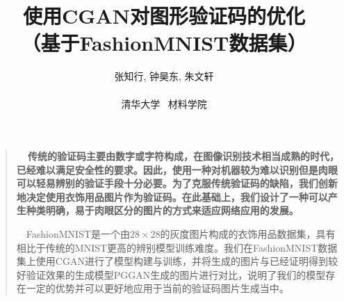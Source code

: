 \documentclass[12pt]{article}
\title{使用CGAN对图形验证码的优化\\ \normalsize{（基于FashionMNIST数据集）}}
\author
{张知行, 钟昊东, 朱文轩\\
\\
\normalsize{清华大学 \ 材料学院}\\
}
\date{}
\newenvironment{sciabstract}{%
\begin{quote} \bf}
{\end{quote}}
\begin{document}
 


\baselineskip24pt


\maketitle 




\begin{sciabstract}
  \ \ 传统的验证码主要由数字或字符构成，在图像识别技术相当成熟的时代，已经难以满足安全性的要求。因此，使用一种对机器较为难以识别但是肉眼可以轻易辨别的验证手段十分必要。为了克服传统验证码的缺陷，我们创新地决定使用衣饰用品图片作为验证码。在此基础上，我们设计了一种可以产生种类明确，易于肉眼区分的图片的方式来适应网络应用的发展。

\ \ FashionMNIST\supercite{DBLP}是一个由$28\times 28$的灰度图片构成的衣饰用品数据集，具有相比于传统的MNIST更高的辨别模型训练难度。我们在FashionMNIST数据集上使用CGAN进行了模型构建与训练，并将生成的图片与已经证明得到较好验证效果的生成模型PGGAN\supercite{DBLP:journals/corr/abs-1710-10196}生成的图片进行对比，说明了我们的模型存在一定的优势并可以更好地应用于当前的验证码图片生成当中。

\end{sciabstract}



\end{document}
